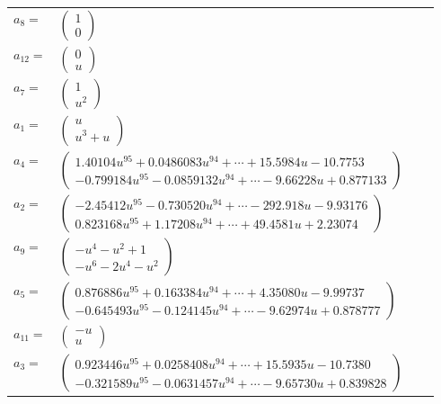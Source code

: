 \documentclass[1p]{elsarticle_modified}
\theoremstyle{definition}
\begin{document}
\begin{tabular}{m{7pt} m{180pt} m{7pt} m{180pt} }
\flushright $a_{8}=$&$\begin{pmatrix}1\\0\end{pmatrix}$ \\
\flushright $a_{12}=$&$\begin{pmatrix}0\\u\end{pmatrix}$ \\
\flushright $a_{7}=$&$\begin{pmatrix}1\\u^2\end{pmatrix}$ \\
\flushright $a_{1}=$&$\begin{pmatrix}u\\u^3+u\end{pmatrix}$ \\
\flushright $a_{4}=$&$\begin{pmatrix}1.40104 u^{95}+0.0486083 u^{94}+\cdots+15.5984 u-10.7753\\-0.799184 u^{95}-0.0859132 u^{94}+\cdots-9.66228 u+0.877133\end{pmatrix}$ \\
\flushright $a_{2}=$&$\begin{pmatrix}-2.45412 u^{95}-0.730520 u^{94}+\cdots-292.918 u-9.93176\\0.823168 u^{95}+1.17208 u^{94}+\cdots+49.4581 u+2.23074\end{pmatrix}$ \\
\flushright $a_{9}=$&$\begin{pmatrix}- u^4- u^2+1\\- u^6-2 u^4- u^2\end{pmatrix}$ \\
\flushright $a_{5}=$&$\begin{pmatrix}0.876886 u^{95}+0.163384 u^{94}+\cdots+4.35080 u-9.99737\\-0.645493 u^{95}-0.124145 u^{94}+\cdots-9.62974 u+0.878777\end{pmatrix}$ \\
\flushright $a_{11}=$&$\begin{pmatrix}- u\\u\end{pmatrix}$ \\
\flushright $a_{3}=$&$\begin{pmatrix}0.923446 u^{95}+0.0258408 u^{94}+\cdots+15.5935 u-10.7380\\-0.321589 u^{95}-0.0631457 u^{94}+\cdots-9.65730 u+0.839828\end{pmatrix}$ \\

\end{tabular}
\end{document}
